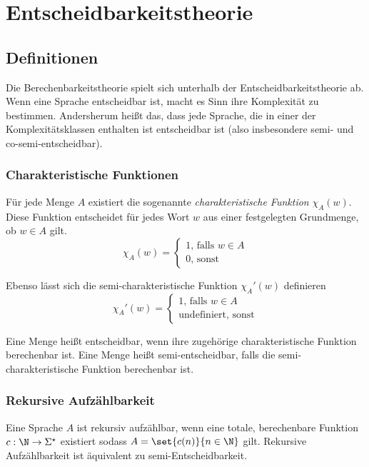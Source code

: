 \chapter{Entscheidbarkeitstheorie}
\section{Definitionen}
Die Berechenbarkeitstheorie spielt sich unterhalb der Entscheidbarkeitstheorie ab. Wenn eine Sprache entscheidbar ist, macht es Sinn ihre Komplexität zu bestimmen. Andersherum heißt das, dass jede Sprache, die in einer der Komplexitätsklassen enthalten ist entscheidbar ist (also insbesondere semi- und co-semi-entscheidbar).

\subsection{Charakteristische Funktionen}
Für jede Menge $A$ existiert die sogenannte \emph{charakteristische Funktion} $\chi_A(w)$. Diese Funktion entscheidet für jedes Wort $w$ aus einer festgelegten Grundmenge, ob $w\in A$ gilt.
\begin{equation*}
	\chi_A(w)=\begin{cases}
		1\text{, falls } w\in A\\
		0\text{, sonst}
	\end{cases}
\end{equation*}

Ebenso lässt sich die semi-charakteristische Funktion $\chi_A'(w)$ definieren
\begin{equation*}
	\chi_A'(w)=\begin{cases}
		1\text{, falls } w\in A\\
		\mathrm{undefiniert}\text{, sonst}
	\end{cases}
\end{equation*}

Eine Menge heißt entscheidbar, wenn ihre zugehörige charakteristische Funktion berechenbar ist. Eine Menge heißt semi-entscheidbar, falls die semi-charakteristische Funktion berechenbar ist.

\subsection{Rekursive Aufzählbarkeit}
Eine Sprache $A$ ist rekursiv aufzählbar, wenn eine totale, berechenbare Funktion $c:\N\rightarrow\Sigma^\star$ existiert sodass $A=\set{c(n)}{n\in\N}$ gilt. Rekursive Aufzählbarkeit ist äquivalent zu semi-Entscheidbarkeit.

